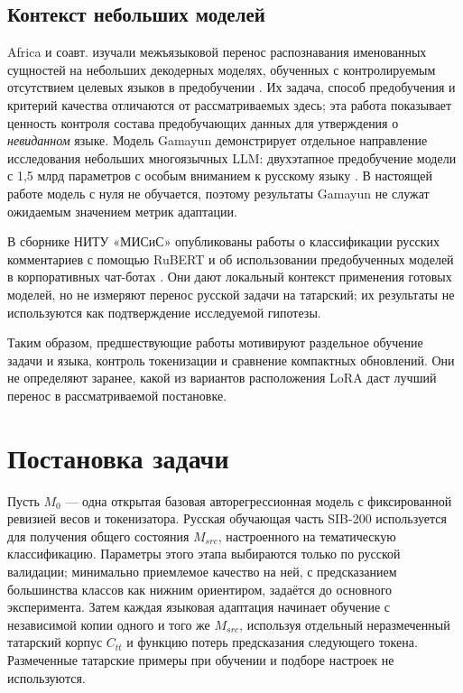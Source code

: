 \documentclass{misisarticle}
\begin{document}
\subsection{Контекст небольших моделей}

Africa и соавт. изучали межъязыковой перенос распознавания именованных сущностей на небольших декодерных моделях, обученных с контролируемым отсутствием целевых языков в предобучении \cite{africa2025meta}. Их задача, способ предобучения и критерий качества отличаются от рассматриваемых здесь; эта работа показывает ценность контроля состава предобучающих данных для утверждения о \emph{невиданном} языке. Модель Gamayun демонстрирует отдельное направление исследования небольших многоязычных LLM: двухэтапное предобучение модели с 1,5 млрд параметров с особым вниманием к русскому языку \cite{podolskiy2025gamayun}. В настоящей работе модель с нуля не обучается, поэтому результаты Gamayun не служат ожидаемым значением метрик адаптации.

В сборнике НИТУ «МИСиС» опубликованы работы о классификации русских комментариев с помощью RuBERT \cite{izmaylov2023rubert} и об использовании предобученных моделей в корпоративных чат-ботах \cite{beresnev2023chatbots}. Они дают локальный контекст применения готовых моделей, но не измеряют перенос русской задачи на татарский; их результаты не используются как подтверждение исследуемой гипотезы.

Таким образом, предшествующие работы мотивируют раздельное обучение задачи и языка, контроль токенизации и сравнение компактных обновлений. Они не определяют заранее, какой из вариантов расположения LoRA даст лучший перенос в рассматриваемой постановке.

\section{Постановка задачи}

Пусть $M_0$ — одна открытая базовая авторегрессионная модель с фиксированной ревизией весов и токенизатора. Русская обучающая часть SIB-200 используется для получения общего состояния $M_{src}$, настроенного на тематическую классификацию. Параметры этого этапа выбираются только по русской валидации; минимально приемлемое качество на ней, с предсказанием большинства классов как нижним ориентиром, задаётся до основного эксперимента. Затем каждая языковая адаптация начинает обучение с независимой копии одного и того же $M_{src}$, используя отдельный неразмеченный татарский корпус $C_{tt}$ и функцию потерь предсказания следующего токена. Размеченные татарские примеры при обучении и подборе настроек не используются.
\end{document}
